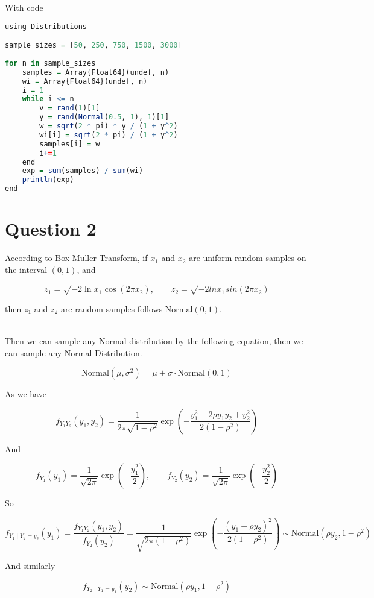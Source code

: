 \documentclass[12pt]{article}
\begin{document}
\begin{flushleft}
\newpage

\qquad With code

\begin{lstlisting}[language=R]
using Distributions

sample_sizes = [50, 250, 750, 1500, 3000]
    
for n in sample_sizes 
    samples = Array{Float64}(undef, n)
    wi = Array{Float64}(undef, n)
    i = 1
    while i <= n
        v = rand(1)[1]
        y = rand(Normal(0.5, 1), 1)[1]
        w = sqrt(2 * pi) * y / (1 + y^2)
        wi[i] = sqrt(2 * pi) / (1 + y^2)
        samples[i] = w
        i+=1 
    end
    exp = sum(samples) / sum(wi)
    println(exp)
end    
\end{lstlisting} 

\section{Question 2}

\qquad According to Box Muller Transform, if $x_1$ and $x_2$ are uniform random samples on the interval $(0,1)$, and

$$
z_1 = \sqrt{-2 \ln x_1}\cos(2\pi x_2), \qquad z_2 = \sqrt{-2 ln x_1}sin(2\pi x_2)
$$

\qquad then $z_1$ and $z_2$ are random samples follows $\text{Normal}(0,1)$.

~\\

\qquad Then we can sample any Normal distribution by the following equation, then we can sample any Normal Distribution.

$$
\text{Normal}(\mu, \sigma^2) = \mu + \sigma \cdot \text{Normal}(0,1)
$$

\qquad As we have

$$
f_{Y_1Y_2}(y_1, y_2) = \frac{1}{2\pi \sqrt{1-\rho^2}}\exp\left(-\frac{y_1^2 - 2\rho y_1y_2 + y_2^2}{2(1-\rho^2)}\right)
$$

\qquad And

$$
f_{Y_1}(y_1) = \frac{1}{\sqrt{2\pi}}\exp(-\frac{y_1^2}{2}), \qquad f_{Y_2}(y_2) = \frac{1}{\sqrt{2\pi}}\exp(-\frac{y_2^2}{2})
$$

\qquad So

$$
f_{Y_1 \mid Y_2 = y_2}(y_1) = \frac{f_{Y_1Y_2}(y_1, y_2)}{f_{Y_2}(y_2)} = \frac{1}{\sqrt{2\pi (1-\rho^2)}}\exp(-\frac{(y_1 - \rho y_2)^2}{2(1-\rho^2)}) \sim \text{Normal}(\rho y_2, 1-\rho^2)
$$

\qquad And similarly

$$
f_{Y_2 \mid Y_1 = y_1}(y_2) \sim \text{Normal}(\rho y_1, 1-\rho^2)
$$


\end{flushleft}
\end{document}
